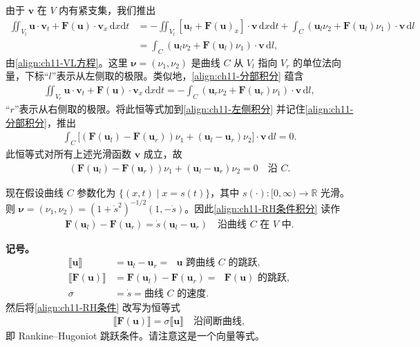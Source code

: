 \documentclass[../../main.tex]{subfiles}
\begin{document}
由于 $\mathbf{v}$ 在 $V$ 内有紧支集，我们推出
\begin{align}
\iint_{V_l}\mathbf{u}\cdot\mathbf{v}_t+\mathbf{F}(\mathbf{u})\cdot\mathbf{v}_x\,\mathrm{d}x\mathrm{d}t &= -\iint_{V_l}[\mathbf{u}_t+\mathbf{F}(\mathbf{u})_x]\cdot\mathbf{v}\,\mathrm{d}x\mathrm{d}t+\int_C(\mathbf{u}_l\nu_2+\mathbf{F}(\mathbf{u}_l)\nu_1)\cdot\mathbf{v}\,\mathrm{d}l\nonumber\\
&=\int_C(\mathbf{u}_l\nu_2+\mathbf{F}(\mathbf{u}_l)\nu_1)\cdot\mathbf{v}\,\mathrm{d}l,
\label{align:ch11-左侧积分}
\end{align}
由\eqref{align:ch11-VL方程}。这里 $\boldsymbol{\nu}=(\nu_1,\nu_2)$ 是曲线 $C$ 从 $V_l$ 指向 $V_r$ 的单位法向量，下标``$l$''表示从左侧取的极限。类似地，\eqref{align:ch11-分部积分} 蕴含
\begin{align*}
\iint_{V_r}\mathbf{u}\cdot\mathbf{v}_t+\mathbf{F}(\mathbf{u})\cdot\mathbf{v}_x\,\mathrm{d}x\mathrm{d}t=-\int_C(\mathbf{u}_r\nu_2+\mathbf{F}(\mathbf{u}_r)\nu_1)\cdot\mathbf{v}\,\mathrm{d}l,
\end{align*}
``$r$''表示从右侧取的极限。将此恒等式加到\eqref{align:ch11-左侧积分} 并记住\eqref{align:ch11-分部积分}，推出
\begin{align*}
\int_C\big[(\mathbf{F}(\mathbf{u}_l)-\mathbf{F}(\mathbf{u}_r))\nu_1+(\mathbf{u}_l-\mathbf{u}_r)\nu_2\big]\cdot\mathbf{v}\,\mathrm{d}l=0.
\end{align*}
此恒等式对所有上述光滑函数 $\mathbf{v}$ 成立，故
\begin{align}
(\mathbf{F}(\mathbf{u}_l)-\mathbf{F}(\mathbf{u}_r))\nu_1+(\mathbf{u}_l-\mathbf{u}_r)\nu_2=0 \quad \text{沿 } C.
\label{align:ch11-RH条件积分}
\end{align}

现在假设曲线 $C$ 参数化为 $\{(x,t)\mid x=s(t)\}$，其中 $s(\cdot):[0,\infty)\to\mathbb{R}$ 光滑。则 $\boldsymbol{\nu}=(\nu_1,\nu_2)=(1+\dot{s}^2)^{-1/2}(1,-\dot{s})$。因此\eqref{align:ch11-RH条件积分} 读作
\begin{align}
\mathbf{F}(\mathbf{u}_l)-\mathbf{F}(\mathbf{u}_r)=\dot{s}(\mathbf{u}_l-\mathbf{u}_r) \quad \text{沿曲线 } C \text{ 在 } V \text{ 中}.
\label{align:ch11-RH条件}
\end{align}

\textbf{记号。}
\begin{align*}
\llbracket\mathbf{u}\rrbracket &=\mathbf{u}_l-\mathbf{u}_r=\text{ }\mathbf{u}\text{ 跨曲线 }C\text{ 的跳跃},\\
\llbracket\mathbf{F}(\mathbf{u})\rrbracket &=\mathbf{F}(\mathbf{u}_l)-\mathbf{F}(\mathbf{u}_r)=\text{ }\mathbf{F}(\mathbf{u})\text{ 的跳跃},\\
\sigma &=\dot{s}=\text{曲线 }C\text{ 的速度}.
\end{align*}
然后将\eqref{align:ch11-RH条件} 改写为恒等式
\begin{align}
\llbracket\mathbf{F}(\mathbf{u})\rrbracket=\sigma\llbracket\mathbf{u}\rrbracket \quad \text{沿间断曲线},
\label{align:ch11-RH跳跃条件}
\end{align}
即 Rankine--Hugoniot 跳跃条件。请注意这是一个向量等式。
\end{document}
